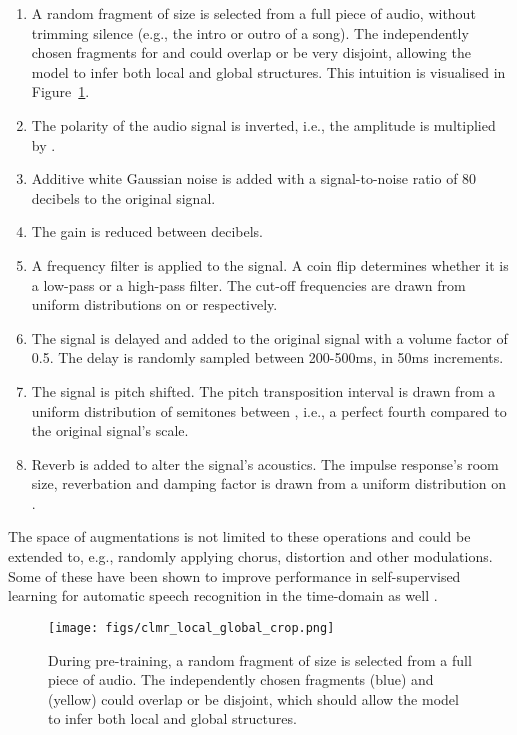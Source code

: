 \documentclass{article}
\begin{document}
\begin{enumerate}[topsep=0pt, partopsep=0pt, leftmargin=13pt, parsep=0pt, itemsep=4pt]
    \item A random fragment of size  is selected from a full piece of audio, without trimming silence (e.g., the intro or outro of a song).
    The independently chosen fragments for  and  could overlap or be very disjoint, allowing the model to infer both local and global structures. This intuition is visualised in Figure~\ref{fig:global_local}.
    \item The polarity of the audio signal is inverted, i.e., the amplitude is multiplied by .
    \item Additive white Gaussian noise is added with a signal-to-noise ratio of 80 decibels to the original signal.
    \item The gain is reduced between  decibels.
    \item A frequency filter is applied to the signal.
    A coin flip determines whether it is a low-pass or a high-pass filter. The cut-off frequencies are drawn from uniform distributions on  or  respectively.
    \item The signal is delayed and added to the original signal with a volume factor of 0.5.
    The delay is randomly sampled between 200-500ms, in 50ms increments.
    \item The signal is pitch shifted.
    The pitch transposition interval is drawn from a uniform distribution of semitones between , i.e., a perfect fourth compared to the original signal's scale.
    \item Reverb is added to alter the signal's acoustics.
    The impulse response's room size, reverbation and damping factor is drawn from a uniform distribution on .
\end{enumerate}

The space of augmentations is not limited to these operations and could be extended to, e.g., randomly applying chorus, distortion and other modulations. Some of these have been shown to improve performance in self-supervised learning for automatic speech recognition in the time-domain as well \cite{pase_plus, wavaugment2020}.



\begin{figure}[t]
    \centering
    \texttt{[image: figs/clmr\_local\_global\_crop.png]}
    \caption{During pre-training, a random fragment of size  is selected from a full piece of audio. The independently chosen fragments  (blue) and  (yellow) could overlap or be disjoint, which should allow the  model to infer both local  and global structures.}
    \label{fig:global_local}
\end{figure}
\end{document}
